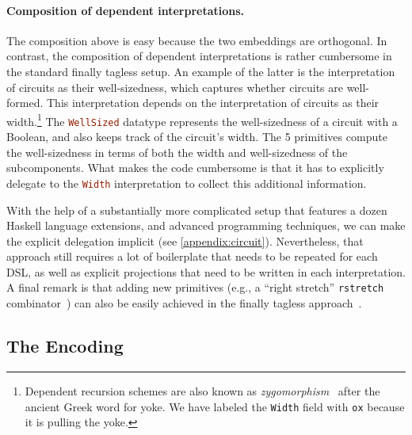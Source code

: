 \paragraph{Composition of dependent interpretations.}

The composition above is easy because the two embeddings are
orthogonal. In contrast, the composition of dependent interpretations is
rather cumbersome in the standard finally tagless setup. An example of the
latter is the interpretation of circuits as their well-sizedness, which
captures whether circuits are well-formed. This interpretation depends on the
interpretation of circuits as their width.\footnote{Dependent recursion schemes
are also known as \emph{zygomorphism}~\cite{fokkinga1989tupling} after the ancient Greek word \emph{\textzeta\textupsilon\textgamma\textomikron\textnu}
for yoke. We have labeled the \lstinline{Width} field with \lstinline{ox} because it is pulling the yoke.}
The \lstinline[language=haskell]{WellSized} datatype represents the well-sizedness of a circuit with
a Boolean, and also keeps track of the circuit's width. The 5 primitives
compute the well-sizedness in terms of both the width and well-sizedness of the subcomponents.
What makes the code cumbersome is that it has to explicitly delegate to the \lstinline[language=haskell]{Width}
interpretation to collect this additional information.

With the help of a substantially more complicated setup that features a dozen
Haskell language extensions, and advanced programming techniques, we can make
the explicit delegation implicit (see \cref{appendix:circuit}). Nevertheless,
that approach still requires a lot of boilerplate that needs to be repeated for
each DSL, as well as explicit projections that need to be written in each
interpretation. A final remark is that adding new primitives (e.g.,
a ``right stretch'' \lstinline{rstretch}
combinator~\cite{hinze2004algebra}) can also be easily 
achieved in the finally tagless approach~\cite{kiselyov2012typed}.

 
\subsection{The \sedel Encoding}

